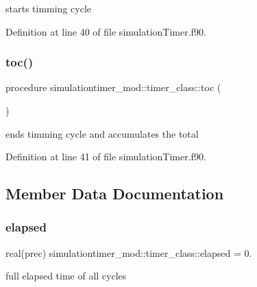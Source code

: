starts timming cycle 



Definition at line 40 of file simulation\+Timer.\+f90.

\mbox{\label{structsimulationtimer__mod_1_1timer__class_aa86e28516c4a22dac2aba3ccbf027233}} 
\subsubsection{\texorpdfstring{toc()}{toc()}}
{\footnotesize\ttfamily procedure simulationtimer\+\_\+mod\+::timer\+\_\+class\+::toc (\begin{DoxyParamCaption}{ }\end{DoxyParamCaption})\hspace{0.3cm}{\ttfamily [private]}}



ends timming cycle and accumulates the total 



Definition at line 41 of file simulation\+Timer.\+f90.



\subsection{Member Data Documentation}
\mbox{\label{structsimulationtimer__mod_1_1timer__class_a17d19848f82f69a33cecb52829992d06}} 
\subsubsection{\texorpdfstring{elapsed}{elapsed}}
{\footnotesize\ttfamily real(prec) simulationtimer\+\_\+mod\+::timer\+\_\+class\+::elapsed = 0.\hspace{0.3cm}{\ttfamily [private]}}



full elapsed time of all cycles 



